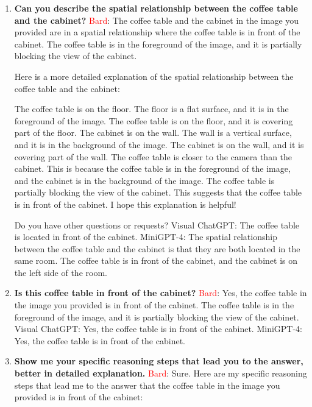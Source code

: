 \begin{enumerate}
    \item \textbf{Can you describe the spatial relationship between the coffee table and the cabinet?}
    \subitem \textcolor{Red}{Bard}: 
    The coffee table and the cabinet in the image you provided are in a spatial relationship where the coffee table is in front of the cabinet. The coffee table is in the foreground of the image, and it is partially blocking the view of the cabinet.

    Here is a more detailed explanation of the spatial relationship between the coffee table and the cabinet:

    The coffee table is on the floor. The floor is a flat surface, and it is in the foreground of the image. The coffee table is on the floor, and it is covering part of the floor.
    The cabinet is on the wall. The wall is a vertical surface, and it is in the background of the image. The cabinet is on the wall, and it is covering part of the wall.
    The coffee table is closer to the camera than the cabinet. This is because the coffee table is in the foreground of the image, and the cabinet is in the background of the image.
    The coffee table is partially blocking the view of the cabinet. This suggests that the coffee table is in front of the cabinet.
    I hope this explanation is helpful!

    Do you have other questions or requests?
    \subitem Visual ChatGPT: The coffee table is located in front of the cabinet.
    \subitem MiniGPT-4: The spatial relationship between the coffee table and the cabinet is that they are both located in the same room. The coffee table is in front of the cabinet, and the cabinet is on the left side of the room.
    \item \textbf{Is this coffee table in front of the cabinet?}
    \subitem \textcolor{Red}{Bard}: 
    Yes, the coffee table in the image you provided is in front of the cabinet. The coffee table is in the foreground of the image, and it is partially blocking the view of the cabinet.
    \subitem Visual ChatGPT: Yes, the coffee table is in front of the cabinet.
    \subitem MiniGPT-4: Yes, the coffee table is in front of the cabinet.
    \item \textbf{Show me your specific reasoning steps that lead you to the answer, better in detailed explanation.}
    \subitem \textcolor{Red}{Bard}: Sure. Here are my specific reasoning steps that lead me to the answer that the coffee table in the image you provided is in front of the cabinet:


\end{enumerate}
